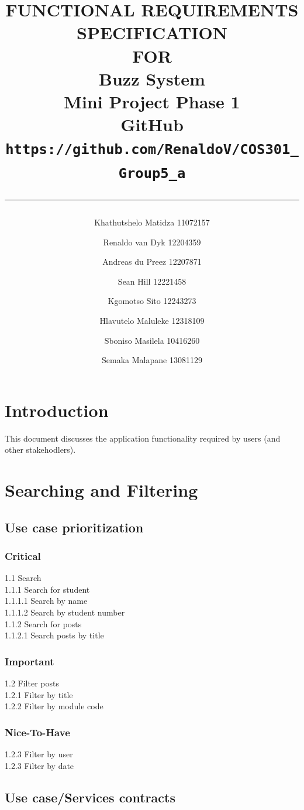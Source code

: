 \documentclass{scrreprt}
\title{%
\author{
Khathutshelo Matidza 11072157\\
\and
Renaldo van Dyk 12204359\\
\and
Andreas du Preez 12207871\\
\and
Sean Hill 12221458\\
\and
Kgomotso Sito 12243273\\
\and
Hlavutelo Maluleke 12318109\\
\and
Sboniso Masilela 10416260\\
\and
Semaka Malapane 13081129\\
}
\centering
\Huge{FUNCTIONAL REQUIREMENTS\\ SPECIFICATION}\\
\vspace{2cm}
FOR\\
\vspace{2cm}
Buzz System\\
\vspace{2cm}
Mini Project Phase 1\\
GitHub\\
\LARGE\texttt{https://github.com/RenaldoV/COS301\_Group5\_a}
\vfill
\vspace{1cm}
\rule{15cm}{3pt}
}
\date{}
\begin{document}
\maketitle
\tableofcontents
\chapter{ Introduction}
This document discusses the application functionality required by users (and other stakehodlers).\\
\chapter{Searching and Filtering}
\section{Use case prioritization}
\subsection{Critical}
1.1 Search\\
1.1.1 Search for student\\
1.1.1.1 Search by name\\
1.1.1.2 Search by student number\\
1.1.2 Search for posts\\
1.1.2.1 Search posts by title\\

\subsection{Important}
1.2 Filter posts\\
1.2.1 Filter by title\\
1.2.2 Filter by module code\\

\subsection{Nice-To-Have}
1.2.3 Filter by user\\
1.2.3 Filter by date\\

\section{Use case/Services contracts}
\end{document}

